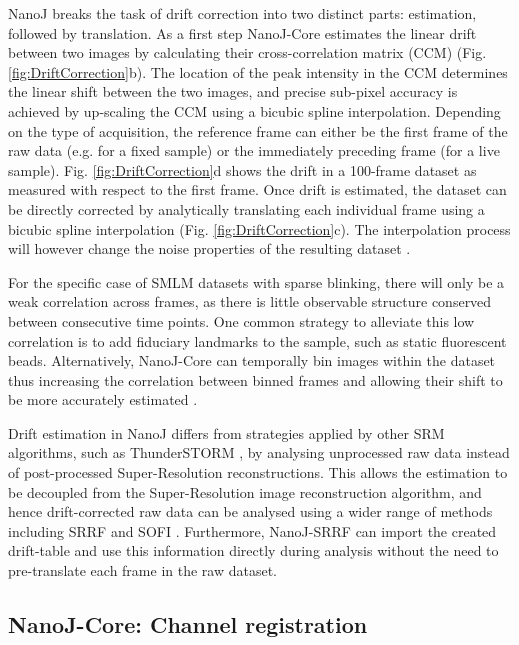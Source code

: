  NanoJ breaks the task of drift correction into two distinct parts: estimation, followed by translation. As a first step NanoJ-Core estimates the linear drift between two images by calculating their cross-correlation matrix (CCM) (Fig. \ref{fig:DriftCorrection}b). The location of the peak intensity in the CCM determines the linear shift between the two images, and precise sub-pixel accuracy is achieved by up-scaling the CCM using a bicubic spline interpolation. Depending on the type of acquisition, the reference frame can either be the first frame of the raw data (e.g. for a fixed sample) or the immediately preceding frame (for a live sample). Fig. \ref{fig:DriftCorrection}d shows the drift in a 100-frame dataset as measured with respect to the first frame. Once drift is estimated, the dataset can be directly corrected by analytically translating each individual frame using a bicubic spline interpolation (Fig. \ref{fig:DriftCorrection}c). The interpolation process will however change the noise properties of the resulting dataset \cite{blaysat2016effect}.
 
 For the specific case of SMLM datasets with sparse blinking, there will only be a weak correlation across frames, as there is little observable structure conserved between consecutive time points. One common strategy to alleviate this low correlation is to add fiduciary landmarks to the sample, such as static fluorescent beads. Alternatively, NanoJ-Core can temporally bin images within the dataset thus increasing the correlation between binned frames and allowing their shift to be more accurately estimated \cite{mlodzianoski2011sample}. 

 Drift estimation in NanoJ differs from strategies applied by other SRM algorithms, such as ThunderSTORM \cite{ovesny2014thunderstorm}, by analysing unprocessed raw data instead of post-processed Super-Resolution reconstructions. This allows the estimation to be decoupled from the Super-Resolution image reconstruction algorithm, and hence drift-corrected raw data can be analysed using a wider range of methods including SRRF and SOFI \cite{dertinger2009fast}. Furthermore, NanoJ-SRRF can import the created drift-table and use this information directly during analysis without the need to pre-translate each frame in the raw dataset.

\subsection*{NanoJ-Core: Channel registration}

